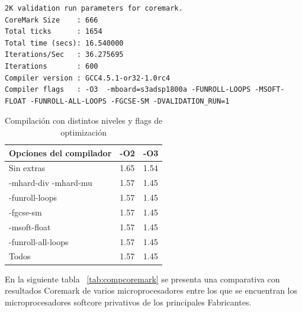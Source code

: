 \begin{lstlisting}[frame=single,caption={Optimización nivel -O3 - Flags activos -FUNROLL-LOOPS -MSOFT-FLOAT
-FUNROLL-ALL-LOOPS -FGCSE-SM},label={lst:salidas},breaklines]
2K validation run parameters for coremark.
CoreMark Size    : 666
Total ticks      : 1654
Total time (secs): 16.540000
Iterations/Sec   : 36.275695
Iterations       : 600
Compiler version : GCC4.5.1-or32-1.0rc4
Compiler flags   : -O3  -mboard=s3adsp1800a -FUNROLL-LOOPS -MSOFT-FLOAT -FUNROLL-ALL-LOOPS -FGCSE-SM -DVALIDATION_RUN=1  
\end{lstlisting}


\begin{table}[h!]
\begin{center}
\begin{tabular}{ |l |l| l|}
\hline
\rowcolor[gray]{0.8} Opciones del compilador&-O2&-O3 \\
\hline
Sin extras 					&1.65 			&1.54\\
\hline
-mhard-div -mhard-mu 		& 1.57			&1.45\\
\hline
-funroll-loops			 	& 1.57			& 1.45 \\
\hline
-fgcse-sm					& 1.57			& 1.45\\
\hline
-msoft-float 				& 1.57			&1.45 \\
\hline
-funroll-all-loops	 		& 1.57			& 1.45 \\
\hline
Todos	 					& 1.57			& 1.45 \\
\hline
\end{tabular}
\end{center}
\caption{Compilación con distintos niveles y flags de optimización}
\end{table}

En la siguiente tabla ~\ref{tab:compcoremark} se presenta una comparativa con resultados Coremark de varios microprocesadores entre los que se
encuentran los microprocesadores softcore privativos de los principales Fabricantes.


